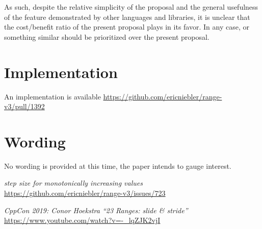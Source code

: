 \documentclass{wg21}
\begin{document}
As such, despite the relative simplicity of the proposal and the general usefulness of the feature 
demonstrated by other languages and libraries, it is unclear that the cost/benefit ratio of the present proposal plays
in its favor.
In any case,  \cite{P1899R0} or something similar \cite{Conor} should be prioritized over the present proposal.

\section{Implementation}
An implementation is available  \url{https://github.com/ericniebler/range-v3/pull/1392}
\section{Wording}

No wording is provided at this time, the paper intends to gauge interest.




\let\oldsection=\section
\renewcommand{\section}[2]{}%
\begin{thebibliography}{9}    
    
    \emph{step size for monotonically increasing values}\newline
    \url{https://github.com/ericniebler/range-v3/issues/723} 
    
    \emph{CppCon 2019: Conor Hoekstra “23 Ranges: slide \& stride”}\newline
    \url{https://www.youtube.com/watch?v=-_lqZJK2vjI} 
\end{thebibliography}



\let\section=\oldsection
\end{document}
